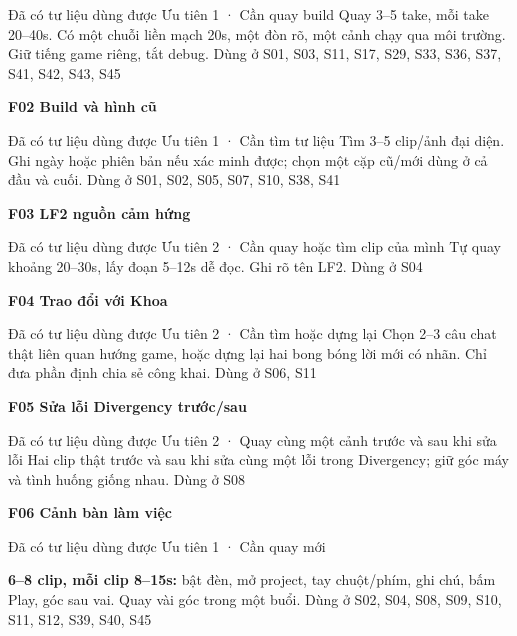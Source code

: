 \documentclass[10pt,a4paper]{article}
\begin{document}
Đã có tư liệu dùng được Ưu tiên 1 · Cần quay build Quay 3–5 take, mỗi take 20–40s. Có một chuỗi liền mạch 20s, một đòn rõ, một cảnh chạy qua môi trường. Giữ tiếng game riêng, tắt debug. Dùng ở S01, S03, S11, S17, S29, S33, S36, S37, S41, S42, S43, S45\par

\clearpage

\textbf{F02 Build và hình cũ}\par

Đã có tư liệu dùng được Ưu tiên 1 · Cần tìm tư liệu Tìm 3–5 clip/ảnh đại diện. Ghi ngày hoặc phiên bản nếu xác minh được; chọn một cặp cũ/mới dùng ở cả đầu và cuối. Dùng ở S01, S02, S05, S07, S10, S38, S41\par

\textbf{F03 LF2 nguồn cảm hứng}\par

Đã có tư liệu dùng được Ưu tiên 2 · Cần quay hoặc tìm clip của mình Tự quay khoảng 20–30s, lấy đoạn 5–12s dễ đọc. Ghi rõ tên LF2. Dùng ở S04\par

\textbf{F04 Trao đổi với Khoa}\par

Đã có tư liệu dùng được Ưu tiên 2 · Cần tìm hoặc dựng lại Chọn 2–3 câu chat thật liên quan hướng game, hoặc dựng lại hai bong bóng lời mới có nhãn. Chỉ đưa phần định chia sẻ công khai. Dùng ở S06, S11\par

\textbf{F05 Sửa lỗi Divergency trước/sau}\par

Đã có tư liệu dùng được Ưu tiên 2 · Quay cùng một cảnh trước và sau khi sửa lỗi Hai clip thật trước và sau khi sửa cùng một lỗi trong Divergency; giữ góc máy và tình huống giống nhau. Dùng ở S08\par

\textbf{F06 Cảnh bàn làm việc}\par

Đã có tư liệu dùng được Ưu tiên 1 · Cần quay mới\par

\textbf{6–8 clip, mỗi clip 8–15s:}  bật đèn, mở project, tay chuột/phím, ghi chú, bấm Play, góc sau vai. Quay vài góc trong một buổi. Dùng ở S02, S04, S08, S09, S10, S11, S12, S39, S40, S45\par
\end{document}
